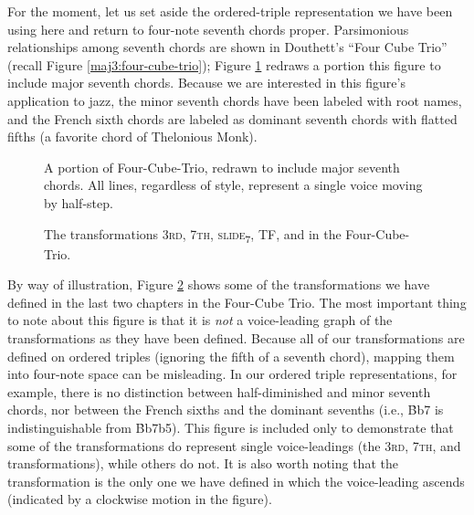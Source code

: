 For the moment, let us set aside the ordered-triple representation we have
been using here and return to four-note seventh chords proper. Parsimonious
relationships among seventh chords are shown in Douthett's ``Four Cube Trio''
(recall Figure \ref{maj3:four-cube-trio}); Figure \ref{pvl:four-cube-correct}
redraws a portion this figure to include major seventh chords.
Because we are interested in this figure's application to jazz, the minor
seventh chords have been labeled with root names, and the French sixth chords
are labeled as dominant seventh chords with flatted fifths (a favorite chord of
Thelonious Monk).

\begin{figure}[tbp]
  \caption[A portion of Four-Cube-Trio, redrawn to include major seventh
  chords.]{A portion of Four-Cube-Trio, redrawn to include major seventh
    chords. All lines, regardless of style, represent a single voice moving by
    half-step.}
  \label{pvl:four-cube-correct}
\end{figure}

\begin{figure}[tbp]
  \caption{The transformations 3\textsc{rd}, 7\textsc{th},
    \textsc{slide}\textsubscript{7}, TF, and \tft in the Four-Cube-Trio.}
  \label{pvl:four-cube-transformations}
\end{figure}

By way of illustration, Figure \ref{pvl:four-cube-transformations} shows some
of the transformations we have defined in the last two chapters in the
Four-Cube Trio. The most important thing to note about this figure is that it
is \emph{not} a voice-leading graph of the transformations as they have been
defined. Because all of our transformations are defined on ordered triples
(ignoring the fifth of a seventh chord), mapping them into four-note space can
be misleading. In our ordered triple representations, for example, there is no
distinction between half-diminished and minor seventh chords, nor between the
French sixths and the dominant sevenths (i.e., \h{Bb7} is indistinguishable
from \h{Bb7b5}). This figure is included only to demonstrate that some of the
transformations do represent single voice-leadings (the \textsc{3rd},
\textsc{7th}, and \slideS transformations), while others do not. It is also
worth noting that the \slideS transformation is the only one we have defined
in which the voice-leading ascends (indicated by a clockwise motion in the figure).

